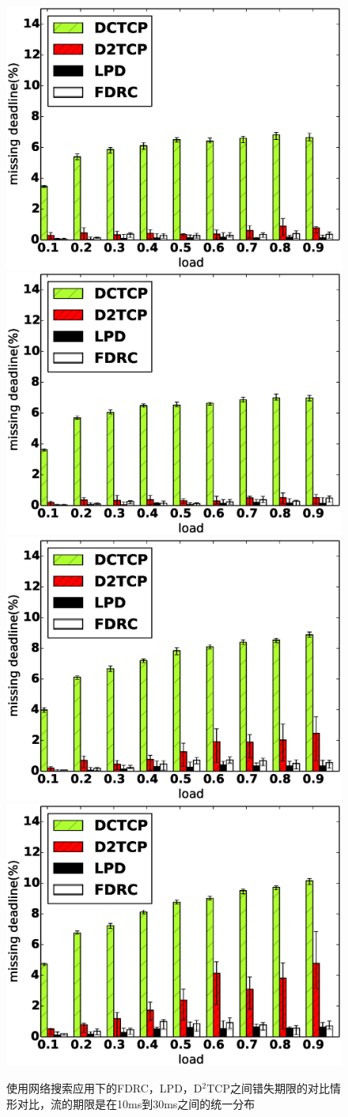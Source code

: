\begin{figure}[h]
  \centering%
    {\includegraphics[width=0.5\columnwidth]{figures/FDRC/evaluation/spineleaf/miss_deadline_1.eps}}%
      {\includegraphics[width=0.5\columnwidth]{figures/FDRC/evaluation/spineleaf/miss_deadline_3.eps}}
    {\includegraphics[width=0.5\columnwidth]{figures/FDRC/evaluation/spineleaf/miss_deadline_7.eps}}%
      {\includegraphics[width=0.5\columnwidth]{figures/FDRC/evaluation/spineleaf/miss_deadline_10.eps}}
  \caption{使用网络搜索应用下的FDRC，LPD，D$^2$TCP之间错失期限的对比情形对比，流的期限是在10ms到30ms之间的统一分布}
  \label{fdrc-miss-spine-web-fig}
\end{figure}

